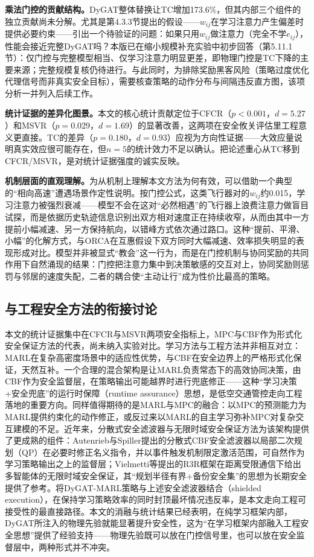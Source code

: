 \documentclass[12pt,a4paper,UTF8]{ctexart}
\begin{document}
\textbf{乘法门控的贡献结构。}DyGAT整体替换让TC增加173.6\%，但其内部三个组件的独立贡献尚未分解。尤其是第4.3.3节提出的假设——$w_{ij}$在学习注意力产生偏差时提供必要约束——引出一个待验证的问题：如果只用$w_{ij}$做注意力（完全不学$e_{ij}$），性能会接近完整DyGAT吗？本版已在缩小规模补充实验中初步回答（第5.11.1节）：仅门控与完整模型相当、仅学习注意力明显更差，即物理门控是TC下降的主要来源；完整规模复核仍待进行。与此同时，为排除奖励黑客风险（策略过度优化代理信号而非真实安全目标），需要核查策略的动作分布与间隔违反直方图，该项分析一并列入后续工作。

\textbf{统计证据的差异化图景。}本文的核心统计贡献定位于CFCR（$p<0.001$，$d=5.27$）和MSVR（$p=0.029$，$d=1.69$）的显著改善，这两项在安全攸关评估里工程意义更直接。TC的差异（$p=0.180$，$d=0.93$）应视为方向性证据——大效应量说明真实效应很可能存在，但$n=5$的统计效力不足以确认。把论述重心从TC移到CFCR/MSVR，是对统计证据强度的诚实反映。

\textbf{机制层面的直观理解。}为从机制上理解本文方法为何有效，可以借助一个典型的“相向高速”遭遇场景作定性说明。按门控公式，这类飞行器对的$w_{ij}$约0.015，学习注意力被强烈衰减——模型不会在这对“必然相遇”的飞行器上浪费注意力做盲目试探，而是依据历史轨迹信息识别出双方相对速度正在持续收窄，从而由其中一方提前小幅减速、另一方保持航向，以错峰方式依次通过路口。这种“提前、平滑、小幅”的化解方式，与ORCA在互惠假设下双方同时大幅减速、效率损失明显的表现形成对比。模型并非被显式“教会”这一行为，而是在门控机制与协同奖励的共同作用下自然涌现的结果：门控把注意力集中到决策敏感的交互对上，协同奖励则惩罚与邻居的速度失配，二者的耦合使“主动让行”成为性价比最高的策略。

\subsection{与工程安全方法的衔接讨论}

本文的统计证据集中在CFCR与MSVR两项安全指标上，MPC与CBF作为形式化安全保证方法的代表，尚未纳入实验对比。学习方法与工程方法并非相互对立：MARL在复杂高密度场景中的适应性优势，与CBF在安全边界上的严格形式化保证，天然互补。一个合理的混合架构是让MARL负责常态下的高效协同决策，由CBF作为安全监督层，在策略输出可能越界时进行兜底修正——这种“学习决策+安全兜底”的运行时保障（runtime assurance）思想，是低空交通管控走向工程落地的重要方向。同样值得期待的是MARL与MPC的融合：以MPC的预测能力为MARL提供约束化的动作修正，或反过来以MARL的自主学习弥补MPC对复杂交互建模的不足。近年来，分散式安全滤波器与无限时域安全保证方法为该架构提供了更成熟的组件：Autenrieb与Spiller\cite{ref60}提出的分散式CBF安全滤波器以局部二次规划（QP）在必要时修正名义指令，并以事件触发机制限定激活范围，可自然作为学习策略输出之上的监督层；Vielmetti等\cite{ref61}提出的R3R框架在距离受限通信下给出多智能体的无限时域安全保证，其“规划半径有界+备份安全集”的思想为长期安全提供了参考。将DyGAT-MARL策略与上述安全滤波器结合（shielded execution），在保持学习策略效率的同时封顶最坏情况违反率，是本文走向工程可接受性的最直接路径。本文的消融与统计结果已经表明，在纯学习框架内部，DyGAT所注入的物理先验就能显著提升安全性，这为“在学习框架内部融入工程安全思想”提供了经验支持——物理先验既可以放在门控信号里，也可以放在安全监督层中，两种形式并不冲突。
\end{document}
